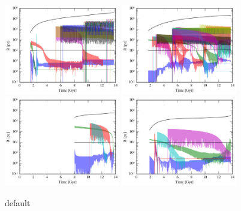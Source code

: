 \documentclass[english, apj]{emulateapj}
\begin{document}
\begin{figure}[htbp]
\begin{center}
\includegraphics[width=0.45\textwidth]{plots/radius_A.png}
\includegraphics[width=0.45\textwidth]{plots/radius_B.png}\\
\includegraphics[width=0.45\textwidth]{plots/radius_C.png}
\includegraphics[width=0.45\textwidth]{plots/radius_D.png}\\
\caption{default}
\label{default}
\end{center}
\end{figure}
\end{document}
